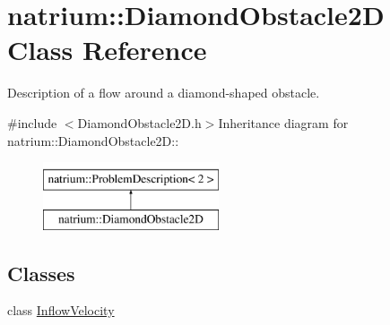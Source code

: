 \hypertarget{classnatrium_1_1DiamondObstacle2D}{
\section{natrium::DiamondObstacle2D Class Reference}
\label{classnatrium_1_1DiamondObstacle2D}
}


Description of a flow around a diamond-\/shaped obstacle.  


{\ttfamily \#include $<$DiamondObstacle2D.h$>$}Inheritance diagram for natrium::DiamondObstacle2D::\begin{figure}[H]
\begin{center}
\leavevmode
\includegraphics[height=2cm]{classnatrium_1_1DiamondObstacle2D}
\end{center}
\end{figure}
\subsection*{Classes}
\begin{DoxyCompactItemize}
\item 
class \hyperlink{classnatrium_1_1DiamondObstacle2D_1_1InflowVelocity}{InflowVelocity}
\end{DoxyCompactItemize}

